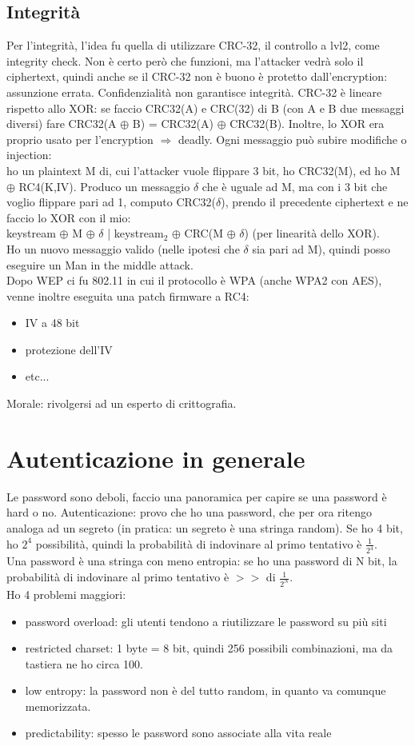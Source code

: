 \documentclass[16px]{article}
\begin{document}
\subsection{Integrità}
Per l'integrità, l'idea fu quella di utilizzare CRC-32, il controllo a lvl2, come integrity check. Non è certo però che funzioni, ma l'attacker vedrà solo il ciphertext, quindi anche se il CRC-32 non è buono è protetto dall'encryption: assunzione errata. Confidenzialità non garantisce integrità. CRC-32 è lineare rispetto allo XOR: se faccio CRC32(A) e CRC(32) di B (con A e B due messaggi diversi) fare CRC32(A $\oplus$ B) = CRC32(A) $\oplus$ CRC32(B). Inoltre, lo XOR era proprio usato per l'encryption $\Rightarrow$ deadly. Ogni messaggio può subire modifiche o injection: \\
ho un plaintext M di, cui l'attacker vuole flippare 3 bit, ho CRC32(M), ed ho M $\oplus$ RC4(K,IV). Produco un messaggio $\delta$ che è uguale ad M, ma con i 3 bit che voglio flippare pari ad 1, computo CRC32($\delta$), prendo il precedente ciphertext e ne faccio lo XOR con il mio:\\
keystream $\oplus$ M $\oplus$ $\delta$ | keystream$_{2}$ $\oplus$ CRC(M $\oplus$ $\delta$) (per linearità dello XOR).\\ Ho un nuovo messaggio valido (nelle ipotesi che $\delta$ sia pari ad M), quindi posso eseguire un Man in the middle attack.\\
Dopo WEP ci fu 802.11 in cui il protocollo è WPA (anche WPA2 con AES), venne inoltre eseguita una patch firmware a RC4:
\begin{itemize}
\item IV a 48 bit
\item protezione dell'IV
\item etc...
\end{itemize}
Morale: rivolgersi ad un esperto di crittografia.
\section{Autenticazione in generale}
Le password sono deboli, faccio una panoramica per capire se una password è hard o no. Autenticazione: provo che ho una password, che per ora ritengo analoga ad un segreto (in pratica: un segreto è una stringa random). Se ho 4 bit, ho $2^4$ possibilità, quindi la probabilità di indovinare al primo tentativo è $\frac{1}{2^4}$.\\ Una password è una stringa con meno entropia: se ho una password di N bit, la probabilità di indovinare al primo tentativo è $>>$ di $\frac{1}{2^N}$.\\ Ho 4 problemi maggiori:
\begin{itemize}
\item password overload: gli utenti tendono a riutilizzare le password su più siti
\item restricted charset: 1 byte = 8 bit, quindi 256 possibili combinazioni, ma da tastiera ne ho circa 100.
\item low entropy: la password non è del tutto random, in quanto va comunque memorizzata.
\item predictability: spesso le password sono associate alla vita reale
\end{itemize}
\end{document}
